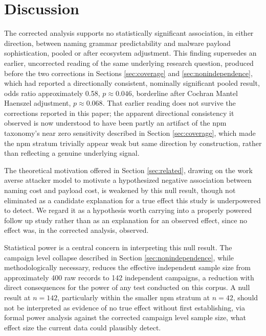 \documentclass[journal]{IEEEtran}
\begin{document}
\section{Discussion}
\label{sec:discussion}

The corrected analysis supports no statistically significant association, in either direction, between naming grammar predictability and malware payload sophistication, pooled or after ecosystem adjustment. This finding supersedes an earlier, uncorrected reading of the same underlying research question, produced before the two corrections in Sections \ref{sec:coverage} and \ref{sec:nonindependence}, which had reported a directionally consistent, nominally significant pooled result, odds ratio approximately 0.58, $p \approx 0.046$, borderline after Cochran Mantel Haenszel adjustment, $p \approx 0.068$. That earlier reading does not survive the corrections reported in this paper; the apparent directional consistency it observed is now understood to have been partly an artifact of the npm taxonomy's near zero sensitivity described in Section \ref{sec:coverage}, which made the npm stratum trivially appear weak but same direction by construction, rather than reflecting a genuine underlying signal.

The theoretical motivation offered in Section \ref{sec:related}, drawing on the work averse attacker model \cite{allodi2021} to motivate a hypothesized negative association between naming cost and payload cost, is weakened by this null result, though not eliminated as a candidate explanation for a true effect this study is underpowered to detect. We regard it as a hypothesis worth carrying into a properly powered follow up study rather than as an explanation for an observed effect, since no effect was, in the corrected analysis, observed.

Statistical power is a central concern in interpreting this null result. The campaign level collapse described in Section \ref{sec:nonindependence}, while methodologically necessary, reduces the effective independent sample size from approximately 400 raw records to 142 independent campaigns, a reduction with direct consequences for the power of any test conducted on this corpus. A null result at $n=142$, particularly within the smaller npm stratum at $n=42$, should not be interpreted as evidence of no true effect without first establishing, via formal power analysis against the corrected campaign level sample size, what effect size the current data could plausibly detect.
\end{document}
